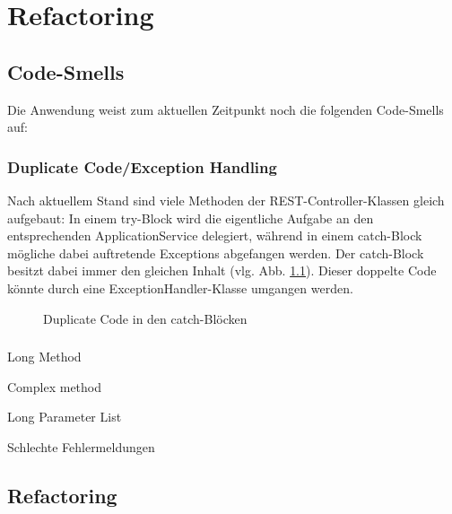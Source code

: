 \chapter{Refactoring}
\section{Code-Smells}
Die Anwendung weist zum aktuellen Zeitpunkt noch die folgenden Code-Smells auf:
\subsection*{Duplicate Code/Exception Handling}
Nach aktuellem Stand sind viele Methoden der REST-Controller-Klassen gleich aufgebaut: In einem try-Block wird die eigentliche Aufgabe an den entsprechenden ApplicationService delegiert, während in einem catch-Block mögliche dabei auftretende Exceptions abgefangen werden. Der catch-Block besitzt dabei immer den gleichen Inhalt (vlg. Abb. \ref{fig:dc}). Dieser doppelte Code könnte durch eine ExceptionHandler-Klasse umgangen werden.

\begin{figure}[!htb]
    \caption[Duplicate Code Section]{Duplicate Code in den catch-Blöcken}
    \label{fig:dc}
\end{figure}

\subsection*{}

Long Method

Complex method

Long Parameter List

Schlechte Fehlermeldungen


\section{Refactoring}
